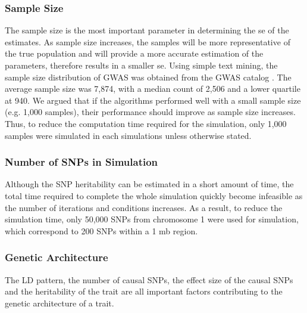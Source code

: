 		\subsubsection{Sample Size}
			The sample size is the most important parameter in determining the \gls{se} of the estimates. 
			As sample size increases, the samples will be more representative of the true population and will provide a more accurate estimation of the parameters, therefore results in a smaller \gls{se}.
			Using simple text mining, the sample size distribution of \gls{GWAS} was obtained from the \gls{GWAS} catalog \citep{Welter2014}.
			The average sample size was 7,874, with a median count of 2,506 and a lower quartile at 940. 
			We argued that if the algorithms performed well with a small sample size (e.g. 1,000 samples), their performance should improve as sample size increases.
			Thus, to reduce the computation time required for the simulation, only 1,000 samples were simulated in each simulations unless otherwise stated.
				
%			
		\subsubsection{Number of SNPs in Simulation}
			Although the \gls{SNP} heritability can be estimated in a short amount of time, the total time required to complete the whole simulation quickly become infeasible as the number of iterations and conditions increases.
			As a result, to reduce the simulation time, only 50,000 \glspl{SNP} from chromosome 1 were used for simulation, which correspond to 200 \glspl{SNP} within a 1 \gls{mb} region.
			
		\subsubsection{Genetic Architecture}
			The \gls{LD} pattern, the number of causal \glspl{SNP}, the effect size of the causal \glspl{SNP} and the heritability of the trait are all important factors contributing to the genetic architecture of a trait. 
		
